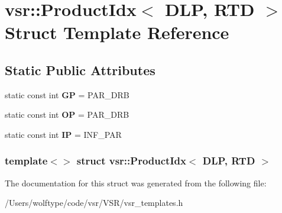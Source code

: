 \hypertarget{structvsr_1_1_product_idx_3_01_d_l_p_00_01_r_t_d_01_4}{\section{vsr\-:\-:Product\-Idx$<$ D\-L\-P, R\-T\-D $>$ Struct Template Reference}
\label{structvsr_1_1_product_idx_3_01_d_l_p_00_01_r_t_d_01_4}
}
\subsection*{Static Public Attributes}
\begin{DoxyCompactItemize}
\item 
\hypertarget{structvsr_1_1_product_idx_3_01_d_l_p_00_01_r_t_d_01_4_ae2db620011470b9d2d5c6eeb5081bbe8}{static const int {\bfseries G\-P} = P\-A\-R\-\_\-\-D\-R\-B}\label{structvsr_1_1_product_idx_3_01_d_l_p_00_01_r_t_d_01_4_ae2db620011470b9d2d5c6eeb5081bbe8}

\item 
\hypertarget{structvsr_1_1_product_idx_3_01_d_l_p_00_01_r_t_d_01_4_a5432dbeb5f59838f3ac61b2c088f7fb0}{static const int {\bfseries O\-P} = P\-A\-R\-\_\-\-D\-R\-B}\label{structvsr_1_1_product_idx_3_01_d_l_p_00_01_r_t_d_01_4_a5432dbeb5f59838f3ac61b2c088f7fb0}

\item 
\hypertarget{structvsr_1_1_product_idx_3_01_d_l_p_00_01_r_t_d_01_4_af8e87dae4be51f9e6f689f8cd262adf4}{static const int {\bfseries I\-P} = I\-N\-F\-\_\-\-P\-A\-R}\label{structvsr_1_1_product_idx_3_01_d_l_p_00_01_r_t_d_01_4_af8e87dae4be51f9e6f689f8cd262adf4}

\end{DoxyCompactItemize}
\subsubsection*{template$<$$>$ struct vsr\-::\-Product\-Idx$<$ D\-L\-P, R\-T\-D $>$}



The documentation for this struct was generated from the following file\-:\begin{DoxyCompactItemize}
\item 
/\-Users/wolftype/code/vsr/\-V\-S\-R/vsr\-\_\-templates.\-h\end{DoxyCompactItemize}
